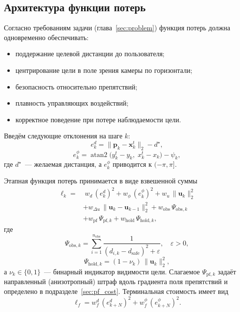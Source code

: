 \subsection{Архитектура функции потерь}

Согласно требованиям задачи (глава~\ref{sec:problem}) функция потерь
должна одновременно обеспечивать:
\begin{itemize}
    \item поддержание целевой дистанции до пользователя;
    \item центрирование цели в поле зрения камеры по горизонтали;
    \item безопасность относительно препятствий;
    \item плавность управляющих воздействий;
    \item корректное поведение при потере наблюдаемости цели.
\end{itemize}

Введём следующие отклонения на шаге $k$:
\begin{equation}
e^{d}_{k} = \|\mathbf{p}_k - \mathbf{x}^{t}_k\|_2 - d^{\star},
\label{eq:err_dist}
\end{equation}
\begin{equation}
e^{\phi}_{k} =
\operatorname{atan2}\bigl(y^{t}_k - y_k,\; x^{t}_k - x_k\bigr) - \psi_k,
\label{eq:err_bearing}
\end{equation}
где $d^{\star}$~--- желаемая дистанция, а $e^{\phi}_{k}$ приводится к
$(-\pi,\pi]$.

Этапная функция потерь принимается в виде взвешенной суммы
\begin{align}
      \ell_k = &\; w_d\,(e^{d}_{k})^{2} + w_{\phi}\,(e^{\phi}_{k})^{2} + w_{u}\,\|\mathbf{u}_k\|_2^{2} \nonumber \\
      &+ w_{\Delta u}\,\|\mathbf{u}_k - \mathbf{u}_{k-1}\|_2^{2} + w_{\text{obs}}\,\Psi_{\text{obs},k} \nonumber \\
      &+ w_{\text{pf}}\,\Psi_{\text{pf},k} + w_{\text{hold}}\,\Psi_{\text{hold},k},
      \label{eq:stage_cost}
      \end{align}
где
\begin{equation}
\Psi_{\text{obs},k} =
\sum_{i=1}^{n_{\text{obs}}}
\frac{1}{(d_{i,k} - d_{\text{safe}})^{2} + \varepsilon},
\quad \varepsilon > 0,
\label{eq:psi_obs}
\end{equation}
\begin{equation}
\Psi_{\text{hold},k} = (1 - \nu_k)\,\|\mathbf{u}_k\|_2^{2},
\label{eq:psi_hold}
\end{equation}
а $\nu_k \in \{0,1\}$~--- бинарный индикатор видимости цели.
Слагаемое $\Psi_{\text{pf},k}$ задаёт направленный (анизотропный) штраф
вдоль градиента поля препятствий и определено в
подразделе~\ref{sec:pf_cost}.
Терминальная стоимость имеет вид
\begin{equation}
\ell_f =
w_f^{d}\,(e^{d}_{k+N})^{2}
+ w_f^{\phi}\,(e^{\phi}_{k+N})^{2}.
\label{eq:terminal_cost}
\end{equation}

